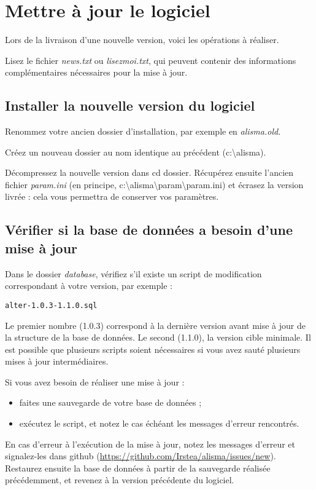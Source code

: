 \section{Mettre à jour le logiciel}
\label{maj}
Lors de la livraison d'une nouvelle version, voici les opérations à réaliser.

Lisez le fichier \textit{news.txt} ou \textit{lisezmoi.txt}, qui peuvent contenir des informations complémentaires nécessaires pour la mise à jour.

\subsection{Installer la nouvelle version du logiciel}

Renommez votre ancien dossier d'installation, par exemple en \textit{alisma.old}.

Créez un nouveau dossier au nom identique au précédent (c:\textbackslash{}alisma).

Décompressez la nouvelle version dans cd dossier. Récupérez ensuite l'ancien fichier \textit{param.ini} (en principe, c:\textbackslash{}alisma\textbackslash{}param\textbackslash{}param.ini) et écrasez la version livrée : cela vous permettra de conserver vos paramètres.

\subsection{Vérifier si la base de données a besoin d'une mise à jour}
\label{dbmaj}

Dans le dossier \textit{database}, vérifiez s'il existe un script de modification correspondant à votre version, par exemple :

\begin{lstlisting}
alter-1.0.3-1.1.0.sql
\end{lstlisting}

Le premier nombre (1.0.3) correspond à la dernière version avant mise à jour de la structure de la base de données. Le second (1.1.0), la version cible minimale. Il est possible que plusieurs scripts soient nécessaires si vous avez sauté plusieurs mises à jour intermédiaires.

Si vous avez besoin de réaliser une mise à jour :
\begin{itemize}
\item faites une sauvegarde de votre base de données ;
\item exécutez le script, et notez le cas échéant les messages d'erreur rencontrés.
\end{itemize}

En cas d'erreur à l'exécution de la mise à jour, notez les messages d'erreur et signalez-les dans github (\url{https://github.com/Irstea/alisma/issues/new}).
Restaurez ensuite la base de données à partir de la sauvegarde réalisée précédemment, et revenez à la version précédente du logiciel.


